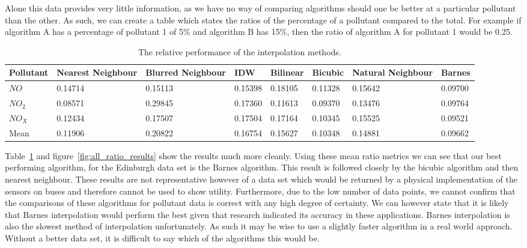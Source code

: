 		Alone this data provides very little information, as we have no way of comparing algorithms should one be better at a particular pollutant than the other. As such, we can create a table which states the ratios of the percentage of a pollutant compared to the total. For example if algorithm A has a percentage of pollutant 1 of 5\% and algorithm B has 15\%, then the ratio of algorithm A for pollutant 1 would be 0.25.

		\begin{table}[H]
			\centering
    		\begin{tabularx}{\linewidth}{|X|X|X|X|X|X|X|X|}
    			\hline
				Pollutant & Nearest Neighbour & Blurred Neighbour & IDW & Bilinear & Bicubic & Natural Neighbour & Barnes \\ \hline
				$NO$ & 0.14714 & 0.15113 & 0.15398 & 0.18105 & 0.11328 & 0.15642 & 0.09700 \\
				$NO_{2}$ & 0.08571 & 0.29845 & 0.17360 & 0.11613 & 0.09370 & 0.13476 & 0.09764\\
				$NO_{X}$ & 0.12434 & 0.17507 & 0.17504 & 0.17164 & 0.10345 & 0.15525 & 0.09521 \\ \hline
				Mean & 0.11906 & 0.20822 & 0.16754 & 0.15627 & 0.10348 & 0.14881 & 0.09662 \\
				\hline
			\end{tabularx}
			\caption{The relative performance of the interpolation methods.}
			\label{tab:all_ratio_results}
		\end{table}


		Table~\ref{tab:all_ratio_results} and figure~\ref{fig:all_ratio_results} show the results much more cleanly. Using these mean ratio metrics we can see that our best performing algorithm, for the Edinburgh data set is the Barnes algorithm. This result is followed closely by the bicubic algorithm and then nearest neighbour. These results are not representative however of a data set which would be returned  by a physical implementation of the sensors on buses and therefore cannot be used to show utility. Furthermore, due to the low number of data points, we cannot confirm that the comparisons of these algorithms for pollutant data is correct with any high degree of certainty. We can however state that it is likely that Barnes interpolation would perform the best given that research indicated its accuracy in these applications. Barnes interpolation is also the slowest method of interpolation unfortunately. As such it may be wise to use a slightly faster algorithm in a real world approach. Without a better data set, it is difficult to say which of the algorithms this would be. 
